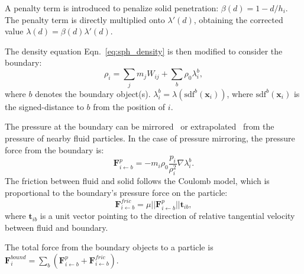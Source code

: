 \documentclass[VANCOUVER,STIX1COL]{WileyNJD-v2}
\begin{document}
A penalty term is introduced to penalize solid penetration: $\beta(d) = 1 - d / h_i$. The penalty term is directly multiplied onto $\lambda'(d)$, obtaining the corrected value $\lambda(d) = \beta(d) \lambda'(d)$.


The density equation Eqn.~\ref{eq:sph_density} is then modified to consider the boundary:
\begin{equation}
    \rho_i = \sum_j m_j W_{ij} + \sum_b \rho_0 \lambda_i^b,
\end{equation}
where $b$ denotes the boundary object(s). $\lambda_i^b = \lambda(\mathrm{sdf}^b(\mathbf{x}_i))$, where $\mathrm{sdf}^b(\mathbf{x}_i)$ is the signed-distance to $b$ from the position of $i$.

The pressure at the boundary can be mirrored~\cite{Akinci12} or extrapolated~\cite{Band18b} from the pressure of nearby fluid particles. In the case of pressure mirroring, the pressure force from the boundary is:
\begin{equation}
    \mathbf{F}_{i \leftarrow b}^p = -m_i \rho_0 \frac{p_i}{\rho_i^2} \nabla\lambda_i^b.
    \label{eq:bound_p}
\end{equation}
The friction between fluid and solid follows the Coulomb model, which is proportional to the boundary's pressure force on the particle:
\begin{equation}
    \mathbf{F}_{i\leftarrow b}^{fric} = \mu ||\mathbf{F}_{i\leftarrow b}^p|| \mathbf{t}_{ib},
    \label{eq:bound_fric}
\end{equation}
where $\mathbf{t}_{ib}$ is a unit vector pointing to the direction of relative tangential velocity between fluid and boundary.

The total force from the boundary objects to a particle is $\mathbf{F}_i^{bound} = \sum_b (\mathbf{F}_{i \leftarrow b}^p + \mathbf{F}_{i\leftarrow b}^{fric})$.

\vspace{-0.5\baselineskip}
\end{document}
